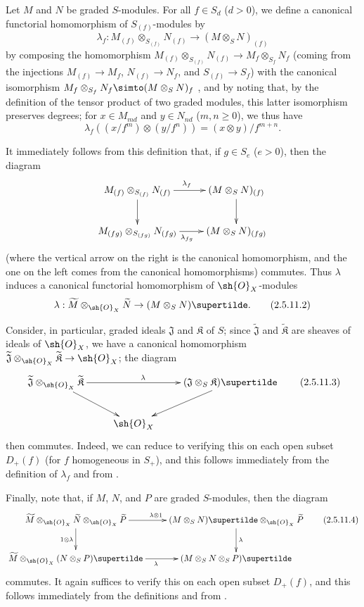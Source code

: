 \begin{env}[2.5.11]
\label{II.2.5.11}
Let $M$ and $N$ be graded $S$-modules.
For all $f\in S_d$ ($d>0$), we define a canonical functorial homomorphism of $S_{(f)}$-modules by
\[
\label{II.2.5.11.1}
  \lambda_f: M_{(f)}\otimes_{S_{(f)}}N_{(f)} \to (M\otimes_S N)_{(f)}
\tag{2.5.11.1}
\]
by composing the homomorphism $M_{(f)}\otimes_{S_{(f)}}N_{(f)}\to M_f\otimes_{S_f}N_f$ (coming from the injections $M_{(f)}\to M_f$, $N_{(f)}\to N_f$, and $S_{(f)}\to S_f$) with the canonical isomorphism $M_f\otimes_{S_f}N_f\simto(M\otimes_S N)_f$ , and by noting that, by the definition of the tensor product of two graded modules, this latter isomorphism preserves degrees;
for $x\in M_{md}$ and $y\in N_{nd}$ ($m,n\geq0$), we thus have
\[
  \lambda_f((x/f^m)\otimes(y/f^n)) = (x\otimes y)/f^{m+n}.
\]

It immediately follows from this definition that, if $g\in S_e$ ($e>0$), then the diagram
\[
  \xymatrix{
    M_{(f)}\otimes_{S_{(f)}}N_{(f)} \ar[r]^{\lambda_f} \ar[d]
    & (M\otimes_S N)_{(f)} \ar[d]
  \\M_{(fg)}\otimes_{S_{(fg)}}N_{(fg)} \ar[r]_{\lambda_{fg}}
    & (M\otimes_S N)_{(fg)}
  }
\]
(where the vertical arrow on the right is the canonical homomorphism, and the one on the left comes from the canonical homomorphisms) commutes.
Thus $\lambda$ induces a canonical functorial homomorphism of $\sh{O}_X$-modules
\[
\label{II.2.5.11.2}
  \lambda: \widetilde{M}\otimes_{\sh{O}_X}\widetilde{N} \to (M\otimes_S N)\supertilde.
\tag{2.5.11.2}
\]

Consider, in particular, graded ideals $\mathfrak{J}$ and $\mathfrak{K}$ of $S$;
since $\widetilde{\mathfrak{J}}$ and $\widetilde{\mathfrak{K}}$ are sheaves of ideals of $\sh{O}_X$, we have a canonical homomorphism $\widetilde{\mathfrak{J}}\otimes_{\sh{O}_X}\widetilde{\mathfrak{K}}\to\sh{O}_X$;
the diagram
\[
\label{II.2.5.11.3}
  \xymatrix{
    \widetilde{\mathfrak{J}}\otimes_{\sh{O}_X}\widetilde{\mathfrak{K}} \ar[rr]^\lambda \ar[dr]
    && (\mathfrak{J}\otimes_S\mathfrak{K})\supertilde \ar[dl]
  \\&\sh{O}_X&
  }
\tag{2.5.11.3}
\]
then commutes.
Indeed, we can reduce to verifying this on each open subset $D_+(f)$ (for $f$ homogeneous in $S_+$), and this follows immediately from the definition  of $\lambda_f$ and from .

Finally, note that, if $M$, $N$, and $P$ are graded $S$-modules, then the diagram
\[
\label{II.2.5.11.4}
  \xymatrix{
    \widetilde{M}\otimes_{\sh{O}_X}\widetilde{N}\otimes_{\sh{O}_X}\widetilde{P} \ar[r]^{\lambda\otimes1} \ar[d]_{1\otimes\lambda}
    & (M\otimes_S N)\supertilde\otimes_{\sh{O}_X}\widetilde{P} \ar[d]^\lambda
  \\\widetilde{M}\otimes_{\sh{O}_X}(N\otimes_S P)\supertilde \ar[r]_\lambda
    & (M\otimes_S N\otimes_S P)\supertilde
  }
\tag{2.5.11.4}
\]
commutes.
It again suffices to verify this on each open subset $D_+(f)$, and this follows immediately from the definitions and from .
\end{env}

